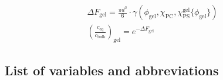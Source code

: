 \documentclass[10pt, a4paper]{article}
\begin{document}
\begin{multicols}{2}
\begin{eqnarray}
    \Delta F_{\text{gel}}
    =\frac{\pi d^3}{6} \cdot \gamma\left(
    \phi_{\text{gel}}, \chi_{\text{PC}},
    \chi_{\text{PS}}^{\text{gel}}\{ \phi_{\text{gel}} \}
    \right)
    \\
    \left(\frac{c_{\text{eq}}}{c_{\text{bulk}}}\right)_{\text{gel}} = e^{-\Delta F_{\text{gel}}}
\end{eqnarray}
\end{multicols}

\pagebreak
\subsection*{List of variables and abbreviations}
\end{document}
